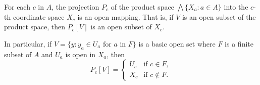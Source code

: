 For each $c$ in $A$, the projection $P_c$ of the product space $\bigwedge \{X_a : a \in A\}$ into the $c$-th coordinate space $X_c$ is an open mapping. That is, if $V$ is an open subset of the product space, then $P_c[V]$ is an open subset of $X_c$.

In particular, if $V = \{y : y_a \in U_a \text{ for } a \text{ in } F\}$ is a basic open set where $F$ is a finite subset of $A$ and $U_a$ is open in $X_a$, then
$$P_c[V] = \begin{cases}
U_c & \text{if } c \in F,\\
X_c & \text{if } c \notin F.
\end{cases}$$
